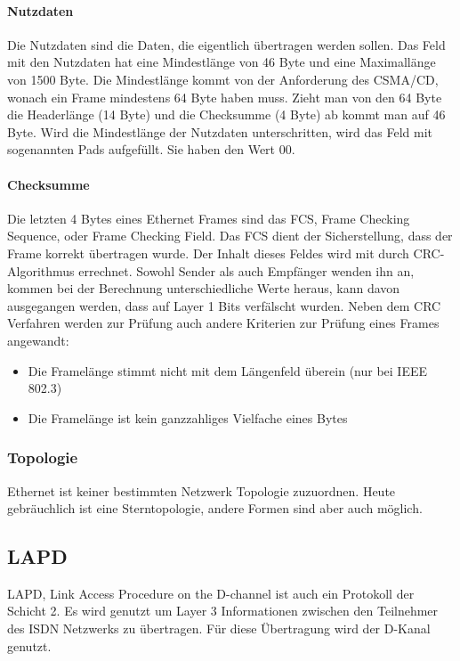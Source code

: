 \documentclass[12pt, a4paper, ngerman]{article}
\newcommand{\fcs}{FCS, Frame Checking Sequence,\xspace}
\begin{document}
\paragraph{Nutzdaten}
Die Nutzdaten sind die Daten, die eigentlich übertragen werden sollen. Das Feld mit den Nutzdaten hat eine Mindestlänge von 46 Byte  und eine Maximallänge von 1500 Byte. Die Mindestlänge kommt von der Anforderung des CSMA/CD, wonach ein Frame mindestens 64 Byte haben muss. Zieht man von den 64 Byte die Headerlänge (14 Byte) und die Checksumme (4 Byte) ab kommt man auf 46 Byte. Wird die Mindestlänge der Nutzdaten unterschritten, wird das Feld mit sogenannten Pads aufgefüllt. Sie haben den Wert 00.
\paragraph{Checksumme \label{checksumme}}
Die letzten 4 Bytes eines Ethernet Frames sind das \fcs oder Frame Checking Field. Das FCS dient der Sicherstellung, dass der Frame korrekt übertragen wurde. Der Inhalt dieses Feldes wird mit durch CRC-Algorithmus errechnet. Sowohl Sender als auch Empfänger wenden ihn an, kommen bei der Berechnung unterschiedliche Werte heraus, kann davon ausgegangen werden, dass auf Layer 1 Bits verfälscht wurden. Neben dem CRC Verfahren werden zur Prüfung auch andere Kriterien zur Prüfung eines Frames angewandt:
\begin{itemize}
	\item Die Framelänge stimmt nicht mit dem Längenfeld überein (nur bei IEEE 802.3)
	\item Die Framelänge ist kein ganzzahliges Vielfache eines Bytes
\end{itemize}


\subsubsection{Topologie}
Ethernet ist keiner bestimmten Netzwerk Topologie zuzuordnen. Heute gebräuchlich ist eine Sterntopologie, andere Formen sind aber auch möglich.   

\subsection{LAPD}
LAPD, Link Access Procedure on the D-channel ist auch ein Protokoll der Schicht 2. Es wird genutzt um Layer 3 Informationen zwischen den Teilnehmer des ISDN Netzwerks zu übertragen. Für diese Übertragung wird der D-Kanal genutzt.
\end{document}
